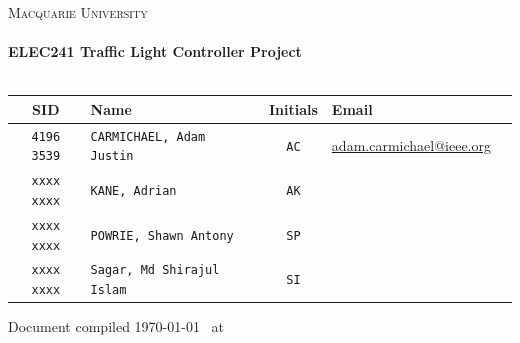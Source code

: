 \begin{titlepage}
\begin{center}

\textsc{\LARGE Macquarie University}\\[1.5cm]
\HRule \\[0.9cm]

{ \huge \bfseries ELEC241 Traffic Light Controller Project}\\[0.4cm]
\HRule \\[1.5cm]

\vfill

\begin{tabularx}{\linewidth}{ c X c X X }
\hline
  SID & Name & Initials & Email \\
  \hline
  \texttt{4196 3539} & \texttt{CARMICHAEL, Adam Justin}  & \texttt{AC} & \url{adam.carmichael@ieee.org} \\
  \texttt{xxxx xxxx} & \texttt{KANE, Adrian}             & \texttt{AK} & \url{} \\
  \texttt{xxxx xxxx} & \texttt{POWRIE, Shawn Antony}     & \texttt{SP} & \url{} \\
  \texttt{xxxx xxxx} & \texttt{Sagar, Md Shirajul Islam} & \texttt{SI} & \url{} \\
\end{tabularx}

\vspace{1cm}
\small{Document compiled \today ~ at \currenttime}
\end{center}

\thiswatermark{
 
}
\end{titlepage}
